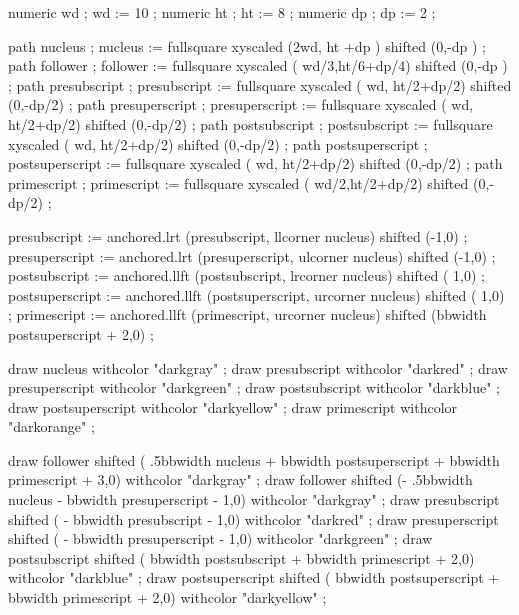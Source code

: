 \startlinecorrection
\startMPcode
    numeric wd ; wd := 10 ;
    numeric ht ; ht :=  8 ;
    numeric dp ; dp :=  2 ;

    path nucleus         ; nucleus         := fullsquare xyscaled (2wd,  ht  +dp  ) shifted (0,-dp  ) ;
    path follower        ; follower        := fullsquare xyscaled ( wd/3,ht/6+dp/4) shifted (0,-dp  ) ;
    path presubscript    ; presubscript    := fullsquare xyscaled ( wd,  ht/2+dp/2) shifted (0,-dp/2) ;
    path presuperscript  ; presuperscript  := fullsquare xyscaled ( wd,  ht/2+dp/2) shifted (0,-dp/2) ;
    path postsubscript   ; postsubscript   := fullsquare xyscaled ( wd,  ht/2+dp/2) shifted (0,-dp/2) ;
    path postsuperscript ; postsuperscript := fullsquare xyscaled ( wd,  ht/2+dp/2) shifted (0,-dp/2) ;
    path primescript     ; primescript     := fullsquare xyscaled ( wd/2,ht/2+dp/2) shifted (0,-dp/2) ;

    presubscript    := anchored.lrt  (presubscript,    llcorner nucleus) shifted (-1,0) ;
    presuperscript  := anchored.lrt  (presuperscript,  ulcorner nucleus) shifted (-1,0) ;
    postsubscript   := anchored.llft (postsubscript,   lrcorner nucleus) shifted ( 1,0) ;
    postsuperscript := anchored.llft (postsuperscript, urcorner nucleus) shifted ( 1,0) ;
    primescript     := anchored.llft (primescript,     urcorner nucleus) shifted (bbwidth postsuperscript + 2,0) ;

    draw nucleus         withcolor "darkgray"   ;
    draw presubscript    withcolor "darkred"    ;
    draw presuperscript  withcolor "darkgreen"  ;
    draw postsubscript   withcolor "darkblue"   ;
    draw postsuperscript withcolor "darkyellow" ;
    draw primescript     withcolor "darkorange" ;

    draw follower        shifted (  .5bbwidth nucleus + bbwidth postsuperscript + bbwidth primescript + 3,0) withcolor "darkgray"   ;
    draw follower        shifted (- .5bbwidth nucleus - bbwidth presuperscript                        - 1,0) withcolor "darkgray"   ;
    draw presubscript    shifted (                    - bbwidth presubscript                          - 1,0) withcolor "darkred"    ;
    draw presuperscript  shifted (                    - bbwidth presuperscript                        - 1,0) withcolor "darkgreen"  ;
    draw postsubscript   shifted (                      bbwidth postsubscript   + bbwidth primescript + 2,0) withcolor "darkblue"   ;
    draw postsuperscript shifted (                      bbwidth postsuperscript + bbwidth primescript + 2,0) withcolor "darkyellow" ;

